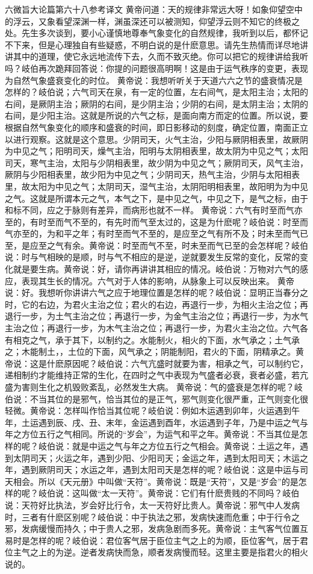 \documentclass[a4paper,12pt,UTF8,twoside]{ctexbook}
\begin{document}
六微旨大论篇第六十八参考译文
黄帝问道：天的规律非常远大呀！如象仰望空中的浮云，又象看望深渊一样，渊虽深还可以被测知，仰望浮云则不知它的终极之处。先生多次谈到，要小心谨慎地尊奉气象变化的自然规律，我听到以后，都怀记不下来，但是心理独自有些疑惑，不明白说的是什麽意思。请先生热情而详尽地讲讲其中的道理，使它永远地流传下去，久而不致灭绝。你可以把它的规律讲给我听吗？岐伯再次跪拜回答说：你提的问题很高明啊！这是由于运气秩序的变更，表现为自然气象盛衰变化的时位。
黄帝说：我想听听关于天道六六之节的盛衰情况是怎样的？岐伯说；六气司天在泉，有一定的位置，左右间气，是太阳主治；太阳的右间，是厥阴主治；厥阴的右间，是少阴主治；少阴的右间，是太阴主治；太阴的右间，是少阳主治。这就是所说的六气之标，是面向南方而定的位置。所以说，要根据自然气象变化的顺序和盛衰的时间，即日影移动的刻度，确定位置，南面正立以进行观察。这就是这个意思。少阴司天，火气主治，少阳与厥阴相表里，故厥阴为中见之气；阳明司天，燥气主治，阳明与太阴相表里，故太阴为中见之气；太阳司天，寒气主治，太阳与少阴相表里，故少阴为中见之气；厥阴司天，风气主治，厥阴与少阳相表里，故少阳为中见之气；少阴司天，热气主治，少阴与太阳相表里，故太阳为中见之气；太阴司天，湿气主治，太阴阳明相表里，故阳明为为中见之气。这就是所谓本元之气，本气之下，是中见之气，中见之下，是气之标，由于和标不同，应之于脉则有差异，而病形也就不一样。
黄帝说：六气有时至而气亦至的，有时至而气不至的，有先时而气至太过的，这是为什麽呢？岐伯说：时至而气亦至的，为和平之年；有时至而气不至的，是应至之气有所不及；时未至而气已至，是应至之气有余。黄帝说：时至而气不至，时未至而气已至的会怎样呢？岐伯说：时与气相映的是顺，时与气不相应的是逆，逆就要发生反常的变化，反常的变化就是要生病。黄帝说：好，请你再讲讲其相应的情况。岐伯说：万物对六气的感应，表现其生长的情况。六气对于人体的影响，从脉象上可以反映出来。
黄帝说：好。我想听你讲讲六气之应于地理位置是怎样的呢？岐伯说：显明正当春分之时，它的右边，为君火主治之位；君火的右边，再退行一步，为相火主治之位；再退行一步，为土气主治之位；再退行一步，为金气主治之位；再退行一步，为水气主治之位；再退行一步，为木气主治之位；再退行一步，为君火主治之位。六气各有相克之气，承于其下，以制约之。水能制火，相火的下面，水气承之；土气承之；木能制土，，土位的下面，风气承之；阴能制阳，君火的下面，阴精承之。黄帝说：这是什麽原因呢？岐伯说：六气亢盛时就要为害，相承之气，可以制约它，递相制约才能维持正常的生化，在四时之气中表现为气盛者必衰，衰者必盛，若亢盛为害则生化之机毁败紊乱，必然发生大病。
黄帝说：气的盛衰是怎样的呢？岐伯说：不当其位的是邪气，恰当其位的是正气，邪气则变化很严重，正气则变化很轻微。黄帝说：怎样叫作恰当其位呢？岐伯说：例如木运遇到卯年，火运遇到午年，土运遇到辰、戌、丑、末年，金运遇到酉年，水运遇到子年，乃是中运之气与年之方位五行之气相同。所说的“岁会”，为运气和平之年。黄帝说：不当其位是怎样的呢？岐伯说：就是中运之气与年之方位五行之气相会。黄帝说：土运之年，遇到太阴司天；火运之年，遇到少阳、少阳司天；金运之年，遇到太阳司天；木运之年，遇到厥阴司天；水运之年，遇到太阳司天是怎样的呢？岐伯说：这是中运与司天相会。所以《天元册》中叫做“天符”。黄帝说：既是“天符”，又是“岁会”的是怎样的呢？岐伯说：这叫做“太一天符”。黄帝说：它们有什麽贵贱的不同吗？岐伯说：天符好比执法，岁会好比行令，太一天符好比贵人。黄帝说：邪气中人发病时，三者有什麽区别呢？岐伯说：中于执法之邪，发病快速而危重；中于行令之邪，发病缓慢而持久；中于贵人之邪，发病急剧而多死。黄帝说：主气客气位置互易时是怎样的呢？岐伯说：君位客气居于臣位主气之上的为顺，臣位客气，居于君位主气之上的为逆。逆者发病快而急，顺者发病慢而轻。这里主要是指君火的相火说的。
\end{document}
